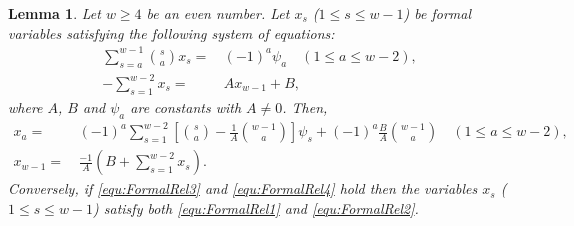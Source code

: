 \documentclass{article}
\theoremstyle{plain}
\newtheorem{lem}[thm]{Lemma}
\theoremstyle{definition}
\begin{document}
\begin{lem}\label{lem:linAlg}
Let $w\ge 4$ be an even number. Let $x_s$ ($1\le s\le w-1$) be formal variables satisfying the following system of equations:
\begin{align}\label{equ:FormalRel1}
\sum_{s=a}^{w-1}  \binom{s}{a} x_s=& \, (-1)^a \psi_a \quad (1\le a\le w-2), \\
 -\sum_{s=1}^{w-2} x_s=& \,A x_{w-1}+B, \label{equ:FormalRel2}
\end{align}
where  $A$, $B$ and $\psi_a$ are constants with $A\ne 0$. Then,
\begin{align}\label{equ:FormalRel3}
x_a=& \, (-1)^a \sum_{s=1}^{w-2} \left[ \binom{s}{a}-\frac1{A}\binom{w-1}{a}\right]  \psi_s+(-1)^a \frac{B}{A} \binom{w-1}{a}  \quad (1\le a\le w-2), \\
x_{w-1}=& \, \frac{-1}{A}\left(B+\sum_{s=1}^{w-2} x_s\right). \label{equ:FormalRel4}
\end{align}
Conversely, if \eqref{equ:FormalRel3} and \eqref{equ:FormalRel4} hold then the variables $x_s$ ($1\le s\le w-1$) satisfy both \eqref{equ:FormalRel1} and \eqref{equ:FormalRel2}.
\end{lem}
\end{document}
